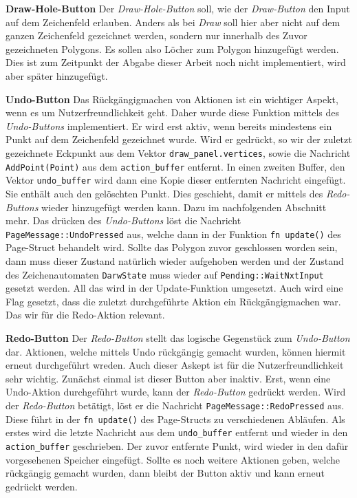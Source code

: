 \textbf{\small{Draw-Hole-Button}}\linebreak
Der \emph{Draw-Hole-Button} soll, wie der \emph{Draw-Button} den Input auf dem Zeichenfeld erlauben. Anders als bei \emph{Draw} soll hier aber nicht auf dem ganzen Zeichenfeld
gezeichnet werden, sondern nur innerhalb des Zuvor gezeichneten Polygons. Es sollen also Löcher zum Polygon hinzugefügt werden. Dies ist zum Zeitpunkt der Abgabe dieser Arbeit noch nicht implementiert, wird aber später hinzugefügt.
\linebreak

\textbf{\small{Undo-Button}}\linebreak
Das Rückgängigmachen von Aktionen ist ein wichtiger Aspekt, wenn es um Nutzerfreundlichkeit geht. Daher wurde diese Funktion mittels des \emph{Undo-Buttons} implementiert.
Er wird erst aktiv, wenn bereits mindestens ein Punkt auf dem Zeichenfeld gezeichnet wurde. Wird er gedrückt, so wir der zuletzt gezeichnete Eckpunkt aus dem Vektor \lstinline{draw_panel.vertices}, sowie die Nachricht \lstinline{AddPoint(Point)}
aus dem \lstinline{action_buffer} entfernt. In einen zweiten Buffer, den Vektor \lstinline{undo_buffer} wird dann eine Kopie dieser entfernten Nachricht eingefügt. Sie enthält auch den gelöschten Punkt.
Dies geschieht, damit er mittels des \emph{Redo-Buttons} wieder hinzugefügt werden kann. Dazu im nachfolgenden Abschnitt mehr. Das drücken des \emph{Undo-Buttons} löst die Nachricht 
\lstinline{PageMessage::UndoPressed} aus, welche dann in der Funktion \lstinline{fn update()} des Page-Struct behandelt wird. Sollte das Polygon zuvor geschlossen worden sein, dann muss dieser Zustand natürlich wieder aufgehoben werden und der Zustand 
des Zeichenautomaten \lstinline{DarwState} muss wieder auf \lstinline{Pending::WaitNxtInput} gesetzt werden. All das wird in der Update-Funktion umgesetzt. Auch wird eine Flag gesetzt, dass die zuletzt durchgeführte Aktion ein Rückgängigmachen war. Das wir 
für die Redo-Aktion relevant.\linebreak

\textbf{\small{Redo-Button}}\linebreak
Der \emph{Redo-Button} stellt das logische Gegenstück zum \emph{Undo-Button} dar. Aktionen, welche mittels Undo rückgängig gemacht wurden, können hiermit erneut durchgeführt wreden. Auch dieser Askept ist für die Nutzerfreundlichkeit sehr wichtig.
Zunächst einmal ist dieser Button aber inaktiv. Erst, wenn eine Undo-Aktion durchgeführt wurde, kann der \emph{Redo-Button} gedrückt werden.
Wird der \emph{Redo-Button} betätigt, löst er die Nachricht \lstinline{PageMessage::RedoPressed} aus. Diese führt in der \lstinline{fn update()} des Page-Structs zu verschiedenen Abläufen.
Als erstes wird die letzte Nachricht aus dem \lstinline{undo_buffer} entfernt und wieder in den \lstinline{action_buffer} geschrieben. Der zuvor entfernte Punkt, wird wieder in den dafür vorgesehenen Speicher eingefügt.
Sollte es noch weitere Aktionen geben, welche rückgängig gemacht wurden, dann bleibt der Button aktiv und kann erneut gedrückt werden.


